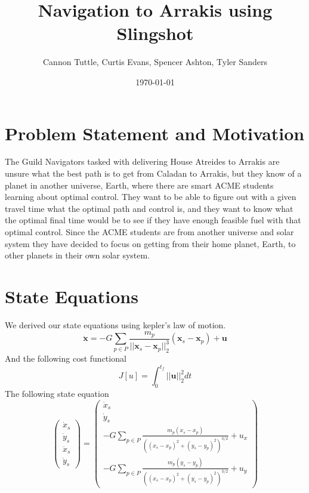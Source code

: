 \documentclass[11pt]{amsart}
\begin{document}
\title{Navigation to Arrakis using Slingshot}
\author{Cannon Tuttle, Curtis Evans, Spencer Ashton, Tyler Sanders}

\date{\today}

\begin{abstract}
    
\end{abstract}

\maketitle

\section{Problem Statement and Motivation}
The Guild Navigators tasked with delivering House Atreides to Arrakis are unsure what the best path is to get from Caladan to Arrakis, but they know of a planet in another universe, Earth, where there 
are smart ACME students learning about optimal control. They want to be able to figure out with a given travel time what the optimal path and control is, and they want to know what the optimal final time 
would be to see if they have enough feasible fuel with that optimal control. Since the ACME students are from another universe and solar system they have decided to focus on getting from their home planet, 
Earth, to other planets in their own solar system. 

\section{State Equations}
We derived our state equations using kepler's law of motion.
\[\ddot{\mathbf{x}} = -G\sum_{p\in{P}}^{}\frac{m_p}{||\mathbf{x}_s-\mathbf{x}_p||_2^3}(\mathbf{x}_s-\mathbf{x}_p) + \mathbf{u}\]
And the following cost functional
\[J[u] = \int_{0}^{t_f}||\mathbf{u}||_2^2dt\]
The following state equation
\[\begin{pmatrix}
    \dot{x}_s \\
    \dot{y}_s \\
    \ddot{x}_s\\
    \ddot{y}_s 
\end{pmatrix} = \begin{pmatrix}
    \dot{x}_s \\
    \dot{y}_s \\
    -G\sum_{p\in{P}}^{}\frac{m_p(x_s - x_p)}{((x_s-x_p)^2+(y_s-y_p)^2)^{3/2}} + u_x \\
    -G\sum_{p\in{P}}^{}\frac{m_p(y_s - y_p)}{((x_s-x_p)^2+(y_s-y_p)^2)^{3/2}} + u_y
\end{pmatrix}\]
\end{document}
